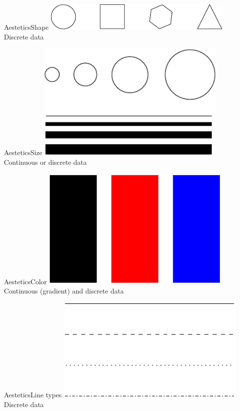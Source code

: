 \documentclass[10pt]{beamer}
\begin{document}

\begin{frame}{Aestetics}{Shape}
  \centering \includegraphics[width=0.7\textwidth]{pics/shape.pdf}
  \\[2em]
  Discrete data
\end{frame}


\begin{frame}{Aestetics}{Size}
  \centering \includegraphics[width=0.7\textwidth]{pics/size.pdf}
  \\[2em]
  Continuous or discrete data
\end{frame}


\begin{frame}{Aestetics}{Color}
  \centering \includegraphics[width=0.7\textwidth]{pics/color.pdf}
  \\[2em]
  Continuous (gradient) and discrete data
\end{frame}


\begin{frame}{Aestetics}{Line types}
  \centering \includegraphics[width=0.7\textwidth]{pics/line_types.pdf}
  \\[2em]
  Discrete data
\end{frame}
\end{document}
